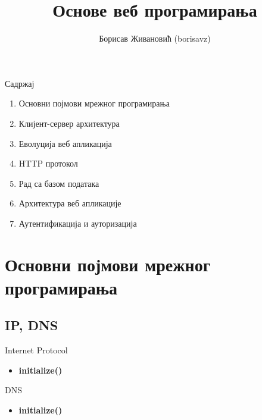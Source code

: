 \documentclass{beamer}
\title{Основе веб програмирања}
\author{Борисав Живановић (borisavz)}
\begin{document}
\begin{frame}
\maketitle
\end{frame}

\begin{frame}{Садржај}

\begin{enumerate}
\item Основни појмови мрежног програмирања
\item Клијент-сервер архитектура
\item Еволуција веб апликација
\item HTTP протокол
\item Рад са базом података
\item Архитектура веб апликације
\item Аутентификација и ауторизација
\end{enumerate}

\end{frame}

\section{Основни појмови мрежног програмирања}
\subsection{IP, DNS}

\begin{frame}{Internet Protocol}

\begin{itemize}
\item \textbf{initialize()}
\end{itemize}

\end{frame}

\begin{frame}{DNS}

\begin{itemize}
\item \textbf{initialize()}
\end{itemize}

\end{frame}
\end{document}
